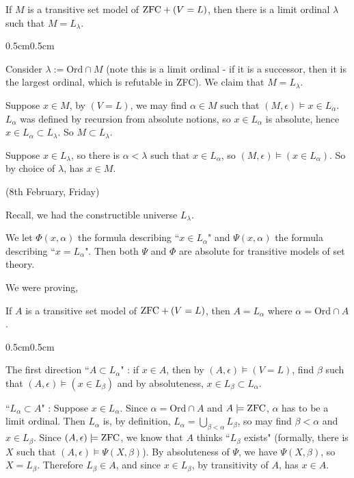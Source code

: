 \documentclass[12pt,a4paper]{article}
\newenvironment{proof}
{\begin{changemargin}{0.5cm}{0.5cm} 
	}%
	{\end{changemargin}
}
\newenvironment{p}
{\begin{proof} 
	}%
	{\end{proof}
}
\begin{document}
\lem If $M$ is a transitive set model of $\text{ZFC} + (V=L)$, then there is a limit ordinal $\lambda$ such that $M= L_{\lambda}$.
\begin{p}
\pf Consider $\lambda := \text{Ord} \cap M$ (note this is a limit ordinal - if it is a successor, then it is the largest ordinal, which is refutable in ZFC). We claim that $M = L_{\lambda}$.

\quad Suppose $x\in M$, by $(V=L)$, we may find $\alpha \in M$ such that $(M, \epsilon) \models x\in L_{\alpha}$. $L_{\alpha}$ was defined by recursion from absolute notions, so $x\in L_{\alpha}$ is absolute, hence $x\in L_{\alpha} \subset L_{\lambda}$. So $M \subset L_{\lambda}$.

\quad Suppose $x\in L_{\lambda}$, so there is $\alpha < \lambda$ such that $x\in L_{\alpha}$, so $(M, \epsilon) \models(x\in L_{\alpha})$. So by choice of $\lambda$, has $x\in M$.

\eop
\end{p}
\s

\newday

(8th February, Friday)
\s

Recall, we had the constructible universe $L_{\lambda}$.
\s

 We let $\Phi(x, \alpha)$ the formula describing ``$x\in L_{\alpha}$" and $\Psi(x,\alpha)$ the formula describing ``$x=L_{\alpha}$". Then both $\Psi$ and $\Phi$ are absolute for transitive models of set theory.
\s

We were proving,

\prop If $A$ is a transitive set model of $\text{ZFC} + (V=L)$, then $A=L_{\alpha}$ where $\alpha = \text{Ord} \cap A$.
\begin{p}
\pf The first direction ``$A\subset L_{\alpha}$" : if $x\in A$, then by $(A, \epsilon)\models (V=L)$, find $\beta$ such that $(A, \epsilon) \models (x\in L_{\beta})$ and by absoluteness, $x\in L_{\beta} \subset L_{\alpha}$.

\quad ``$L_{\alpha} \subset A$" : Suppose $x\in L_{\alpha}$. Since $\alpha =\text{Ord} \cap A$ and $A\models \text{ZFC}$, $\alpha$ has to be a limit ordinal. Then $L_{\alpha}$ is, by definition, $L_{\alpha} = \bigcup_{\beta < \alpha} L_{\beta}$, so may find $\beta < \alpha$ and $x\in L_{\beta}$. Since $(A, \epsilon) \models \text{ZFC}$, we know that $A$ thinks ``$L_{\beta}$ exists" (formally, there is $X$ such that $(A, \epsilon) \models \Psi(X, \beta)$). By absoluteness of $\Psi$, we have $\Psi(X, \beta)$, so $X= L_{\beta}$. Therefore $L_{\beta} \in A$, and since $x\in L_{\beta}$, by transitivity of $A$, has $x\in A$.

\eop
\end{p}
\s
\end{document}
